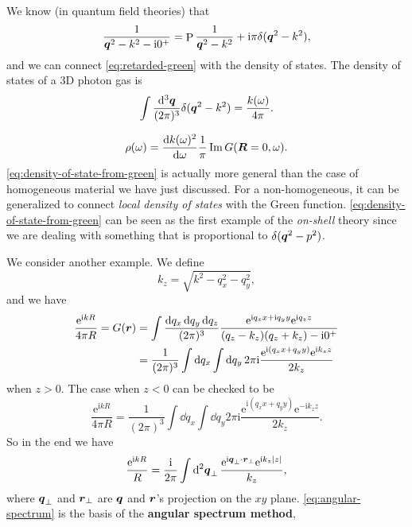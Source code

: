 \documentclass[hyperref, a4paper]{article}
\DeclareMathOperator{\primevalue}{P}
\newcommand*{\ii}{\mathrm{i}}
\newcommand*{\ee}{\mathrm{e}}
\newcommand*{\concept}[1]{{\textbf{#1}}}
\begin{document}
We know (in quantum field theories) that 
\[
    \frac{1}{\vb*{q}^2 - k^2 - \ii 0^+} = \primevalue \frac{1}{\vb*{q}^2 - k^2} + \ii \pi \delta(\vb*{q}^2 - k^2),
\]
and we can connect \eqref{eq:retarded-green} with the density of states.
The density of states of a 3D photon gas is 
\begin{equation}
    \int \frac{\dd[3]{\vb*{q}}}{(2\pi)^3} \delta({\vb*{q}}^2 - k^2) = \frac{k(\omega)}{4\pi}.
\end{equation}

\begin{equation}
    \rho(\omega) = \dv{k(\omega)^2}{\omega} \frac{1}{\pi} \Im G(\vb*{R} = 0, \omega).
    \label{eq:density-of-state-from-green}
\end{equation}
\eqref{eq:density-of-state-from-green} is actually more general than the case of homogeneous material we have just discussed.
For a non-homogeneous, it can be generalized to connect \emph{local density of states} with the Green function.
\eqref{eq:density-of-state-from-green} can be seen as the first example of the \emph{on-shell} theory since we are dealing with something that is proportional to $\delta(\vb*{q}^2 - p^2)$.

We consider another example. We define 
\begin{equation}
    k_z = \sqrt{k^2 - q_x^2 - q_y^2},
    \label{eq:kz-on-shell}
\end{equation}
and we have 
\[
    \begin{aligned}
        \frac{\ee^{\ii k R}}{4 \pi R} = G(\vb*{r}) &= 
        \int \frac{\dd{q_x} \dd{q_y} \dd{q_z}}{(2\pi)^3} \frac{\ee^{\ii q_x x + \ii q_y y} \ee^{\ii q_z z}}{(q_z - k_z) (q_z + k_z) - \ii 0^+} \\
        &= \frac{1}{(2\pi)^3} \int \dd{q_x} \int \dd{q_y} 2 \pi \ii \frac{\ee^{\ii (q_x x + q_y y)} \ee^{\ii k_z z}}{2 k_z}
    \end{aligned}
\]
when $z > 0$. The case when $z < 0$ can be checked to be 
\[
    \frac{\ee^{\ii k R}}{4 \pi R} = \frac{1}{(2\pi)^3} \int \dd{q_x} \int \dd{q_y} 2 \pi \ii \frac{\ee^{\ii (q_x x + q_y y)} \ee^{- \ii k_z z}}{2 k_z}.
\]
So in the end we have 
\begin{equation}
    \frac{\ee^{\ii k R}}{R} = \frac{\ii}{2\pi} \int \dd[2]{\vb*{q}_\bot} \frac{\ee^{\ii \vb*{q}_\bot \cdot \vb*{r}_\bot} \ee^{\ii k_z \abs*{z}}}{k_z},
    \label{eq:angular-spectrum}
\end{equation}
where $\vb*{q}_\bot$ and $\vb*{r}_\bot$ are $\vb*{q}$ and $\vb*{r}$'s projection on the $xy$ plane.
\eqref{eq:angular-spectrum} is the basis of the \concept{angular spectrum method}, %
\end{document}
